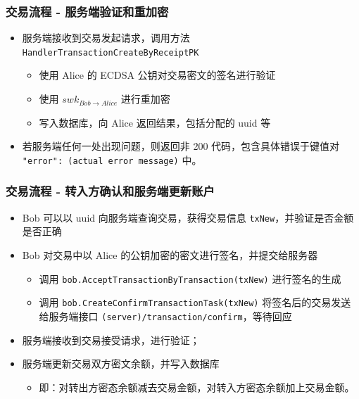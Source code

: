 \begin{frame}
    \frametitle{交易流程 - 服务端验证和重加密}

    \begin{itemize}
        \item 服务端接收到交易发起请求，调用方法 \texttt{HandlerTransactionCreateByReceiptPK}
        \begin{itemize}
            \item 使用 Alice 的 ECDSA 公钥对交易密文的签名进行验证
            \item 使用 $swk_{Bob \rightarrow Alice}$ 进行重加密
            \item 写入数据库，向 Alice 返回结果，包括分配的 uuid 等 
        \end{itemize}
        \item 若服务端任何一处出现问题，则返回非 200 代码，包含具体错误于键值对 \texttt{"error": (actual error message)} 中。
    \end{itemize}

\end{frame}

\begin{frame}
    \frametitle{交易流程 - 转入方确认和服务端更新账户}

    \begin{itemize}
        \item Bob 可以以 uuid 向服务端查询交易，获得交易信息 \texttt{txNew}，并验证是否金额是否正确
        \item Bob 对交易中以 Alice 的公钥加密的密文进行签名，并提交给服务器
        \begin{itemize}
            \item 调用 \texttt{bob.AcceptTransactionByTransaction(txNew)} 进行签名的生成
            \item 调用 \texttt{bob.CreateConfirmTransactionTask(txNew)} 将签名后的交易发送给服务端接口 \texttt{(server)/transaction/confirm}，等待回应
        \end{itemize}
        \item 服务端接收到交易接受请求，进行验证；
        \item 服务端更新交易双方密文余额，并写入数据库
        \begin{itemize}
            \item 即：对转出方密态余额减去交易金额，对转入方密态余额加上交易金额。
        \end{itemize}
    \end{itemize}

\end{frame}

